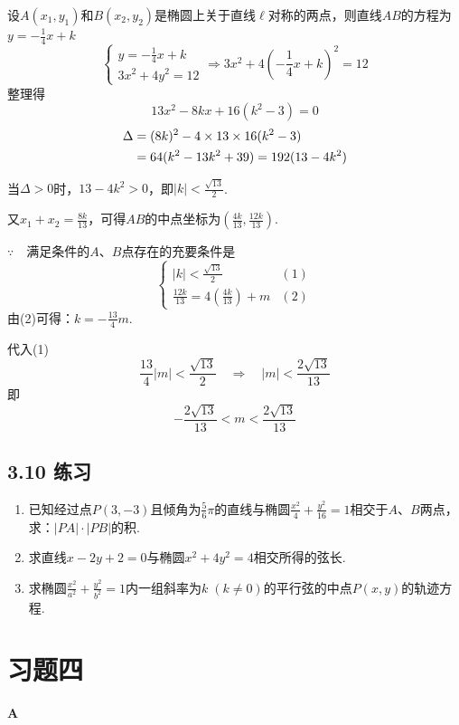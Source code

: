 \begin{solution}
设$A(x_1,y_1)$和$B(x_2,y_2)$是椭圆上关于直线$\ell$对称的两点，则直线$AB$的方程为
$y=-\frac{1}{4}x+k$
\[\begin{cases}
    y=-\frac{1}{4}x+k\\
    3x^2+4y^2=12
\end{cases}\Rightarrow 3x^2+4\left(-\frac{1}{4}x+k\right)^2=12\]
整理得
\[13x^2-8kx+16(k^2-3)=0\]
\[\begin{split}
    \Delta &=(8k)^2-4\times 13\times 16(k^2-3)\\
    &=64(k^2-13k^2+39)=192(13-4k^2)
\end{split}\]

当$\Delta>0$时，$13-4k^2>0$，即$|k|<\frac{\sqrt{13}}{2}$.

又$x_1+x_2=\frac{8k}{13}$，可得$AB$的中点坐标为$\left(\frac{4k}{13},\frac{12k}{13}\right)$.

$\because\quad $满足条件的$A$、$B$点存在的充要条件是
\[\begin{cases}
    |k|<\frac{\sqrt{13}}{2}&(1)\\
    \frac{12k}{13}=4\left(\frac{4k}{13}\right)+m &(2)
\end{cases}\]
由(2)可得：$k=-\frac{13}{4}m$.

代入(1)
\[\frac{13}{4}|m|<\frac{\sqrt{13}}{2}\quad \Rightarrow\quad |m|<\frac{2\sqrt{13}}{13}\]
即
\[-\frac{2\sqrt{13}}{13}<m<\frac{2\sqrt{13}}{13}\]
\end{solution}


\subsection*{3.10 练习}
\begin{enumerate}
\item 已知经过点$P(3,-3)$且倾角为$\frac{5}{6}\pi$的直线与椭圆$\frac{x^2}{4}+\frac{y^2}{16}=1$相交于$A$、$B$两点，求：$|PA|\cdot |PB|$的积.
\item 求直线$x-2y+2=0$与椭圆$x^2+4y^2=4$相交所得的弦长.
\item 求椭圆$\frac{x^2}{a^2}+\frac{y^2}{b^2}=1$内一组斜率为$k\; (k\ne 0)$的平行弦的中点$P(x,y)$的轨迹方程.
\end{enumerate}

\section*{习题四}
\begin{center}
    \bfseries A
\end{center}

